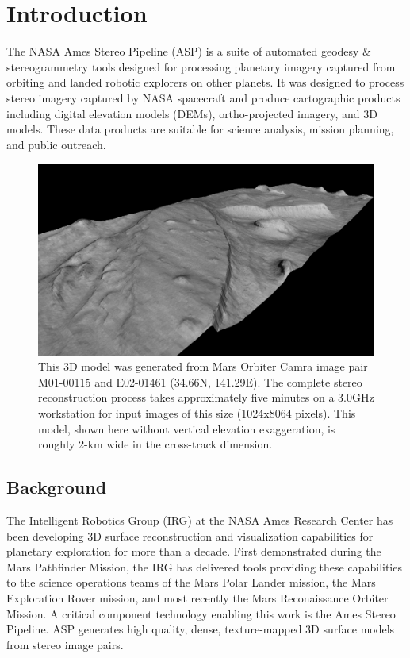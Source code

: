 \chapter{Introduction}

The NASA Ames Stereo Pipeline (ASP) is a suite of automated geodesy \&
stereogrammetry tools designed for processing planetary imagery
captured from orbiting and landed robotic explorers on other planets.
It was designed to process stereo imagery captured by NASA spacecraft
and produce cartographic products including digital elevation models
(DEMs), ortho-projected imagery, and 3D models.  These data products
are suitable for science analysis, mission planning, and public
outreach.

\begin{figure}[tb] 
   \centering
   \includegraphics[width=6.5in]{images/introduction/p19view2.png} 
   \caption{This 3D model was generated from Mars Orbiter Camra image
     pair M01-00115 and E02-01461 (34.66N, 141.29E).  The complete
     stereo reconstruction process takes approximately five minutes on
     a 3.0GHz workstation for input images of this size (1024x8064
     pixels).  This model, shown here without vertical elevation
     exaggeration, is roughly 2-km wide in the cross-track
     dimension. }
   \label{fig:p19}
\end{figure}

\section{Background}

The Intelligent Robotics Group (IRG) at the NASA Ames Research Center
has been developing 3D surface reconstruction and visualization
capabilities for planetary exploration for more than a decade.  First
demonstrated during the Mars Pathfinder Mission, the IRG has delivered
tools providing these capabilities to the science operations teams of
the Mars Polar Lander mission, the Mars Exploration Rover mission, and
most recently the Mars Reconaissance Orbiter Mission. A critical
component technology enabling this work is the Ames Stereo Pipeline.
ASP generates high quality, dense, texture-mapped 3D surface models
from stereo image pairs.

